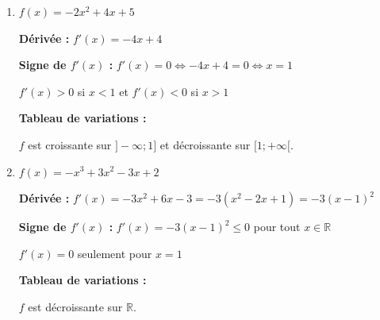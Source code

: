 \documentclass[1,DS,p,e,prof]{phBook}
\begin{document}
\begin{exercice}
\begin{correction}
\begin{enumerate}
            $f$ est décroissante sur $]-\infty;2]$ et croissante sur $[2;+\infty[$.
            
            \item $f(x)=-2x^2+4x+5$
            
            \textbf{Dérivée :} $f'(x)=-4x+4$
            
            \textbf{Signe de $f'(x)$ :} $f'(x)=0 \Leftrightarrow -4x+4=0 \Leftrightarrow x=1$
            
            $f'(x)>0$ si $x<1$ et $f'(x)<0$ si $x>1$
            
            \textbf{Tableau de variations :}
            \begin{center}
            \end{center}
            
            $f$ est croissante sur $]-\infty;1]$ et décroissante sur $[1;+\infty[$.
            
            \item $f(x)=-x^3+3x^2-3x+2$
            
            \textbf{Dérivée :} $f'(x)=-3x^2+6x-3=-3(x^2-2x+1)=-3(x-1)^2$
            
            \textbf{Signe de $f'(x)$ :} $f'(x)=-3(x-1)^2 \leq 0$ pour tout $x \in \mathbb{R}$
            
            $f'(x)=0$ seulement pour $x=1$
            
            \textbf{Tableau de variations :}
            \begin{center}
            \end{center}
            
            $f$ est décroissante sur $\mathbb{R}$.
            

\end{enumerate}
\end{correction}
\end{exercice}
\end{document}
